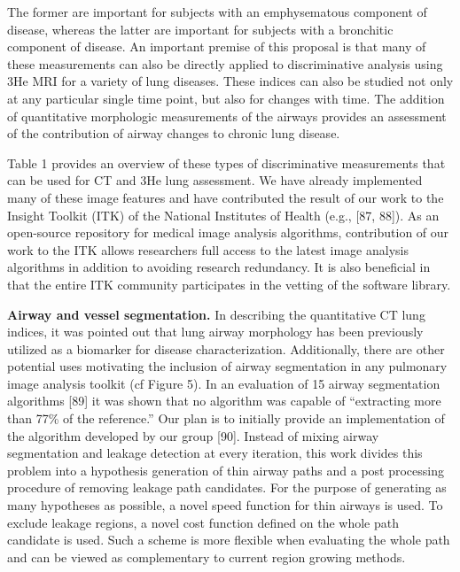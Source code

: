 \documentclass[11pt,]{article}
\begin{document}
The former are important for subjects with an emphysematous component of
disease, whereas the latter are important for subjects with a bronchitic
component of disease. An important premise of this proposal is that many
of these measurements can also be directly applied to discriminative
analysis using 3He MRI for a variety of lung diseases. These indices can
also be studied not only at any particular single time point, but also
for changes with time. The addition of quantitative morphologic
measurements of the airways provides an assessment of the contribution
of airway changes to chronic lung disease.



Table 1 provides an overview of these types of discriminative
measurements that can be used for CT and 3He lung assessment. We have
already implemented many of these image features and have contributed
the result of our work to the Insight Toolkit (ITK) of the National
Institutes of Health (e.g., {[}87, 88{]}). As an open-source repository
for medical image analysis algorithms, contribution of our work to the
ITK allows researchers full access to the latest image analysis
algorithms in addition to avoiding research redundancy. It is also
beneficial in that the entire ITK community participates in the vetting
of the software library.

\textbf{Airway and vessel segmentation.} In describing the quantitative
CT lung indices, it was pointed out that lung airway morphology has been
previously utilized as a biomarker for disease characterization.
Additionally, there are other potential uses motivating the inclusion of
airway segmentation in any pulmonary image analysis toolkit (cf Figure
5). In an evaluation of 15 airway segmentation algorithms {[}89{]} it
was shown that no algorithm was capable of ``extracting more than 77\%
of the reference.'' Our plan is to initially provide an implementation
of the algorithm developed by our group {[}90{]}. Instead of mixing
airway segmentation and leakage detection at every iteration, this work
divides this problem into a hypothesis generation of thin airway paths
and a post processing procedure of removing leakage path candidates. For
the purpose of generating as many hypotheses as possible, a novel speed
function for thin airways is used. To exclude leakage regions, a novel
cost function defined on the whole path candidate is used. Such a scheme
is more flexible when evaluating the whole path and can be viewed as
complementary to current region growing methods.
\end{document}
